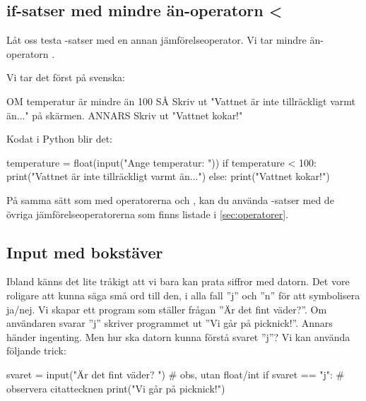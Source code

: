 
\subsection{if-satser med mindre än-operatorn <}
Låt oss testa -satser med en annan jämförelseoperator. Vi tar mindre än-operatorn \cw{<}.

Vi tar det först på svenska:

\begin{pseudo}
OM temperatur är mindre än 100 SÅ
   Skriv ut "Vattnet är inte tillräckligt varmt än..." på skärmen.
ANNARS
   Skriv ut "Vattnet kokar!"
\end{pseudo}

Kodat i Python blir det:

\begin{python}[caption={Mindre än-operatorn},label={}]
temperature = float(input("Ange temperatur: "))
if temperature < 100:
    print("Vattnet är inte tillräckligt varmt än...")
else:
    print("Vattnet kokar!")
\end{python}

På samma sätt som med operatorerna \cw{==} och \cw{<}, kan du använda -satser med de övriga jämförelseoperatorerna som finns listade i \autoref{sec:operatorer}.


\subsection{Input med bokstäver}

Ibland känns det lite tråkigt att vi bara kan prata siffror med datorn. Det vore roligare att kunna säga små ord till den, i alla fall ''j'' och ''n'' för att symbolisera ja/nej.
Vi skapar ett program som ställer frågan ''Är det fint väder?''. Om användaren svarar ''j'' skriver programmet ut ''Vi går på picknick!''. Annars händer ingenting. Men hur ska datorn kunna förstå svaret ''j''? Vi kan använda följande trick:

\begin{python}[caption={Kontrollera vädret},label={ml:kontrolleraVadret}]
svaret = input("Är det fint väder? ") # obs, utan float/int
if svaret == "j": # observera citattecknen
    print("Vi går på picknick!")
\end{python}
\newpage

